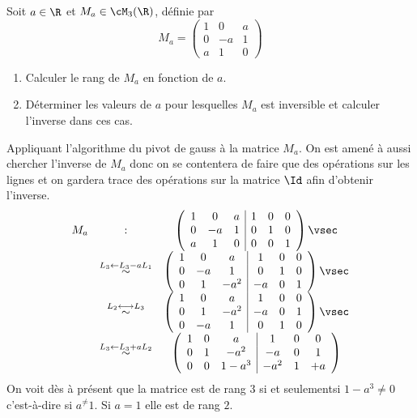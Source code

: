 \begin{exercice}
Soit $a\in \R$ et  $M_a \in\cM_3(\R) $, définie par 
$$ M_a =\left( 
\begin{array}{ccc}
1 & 0 & a\\
0 & -a & 1\\
a & 1 & 0
\end{array}
\right)$$
\begin{enumerate}
\item  Calculer le rang de $M_a$ en fonction de $a$. 
\item Déterminer les valeurs de $a$ pour lesquelles $M_a$ est inversible et calculer l'inverse dans ces cas. 
\end{enumerate}


\end{exercice}
\begin{correction}
Appliquant l'algorithme du pivot de gauss à la matrice $M_a$. On est amené à aussi chercher l'inverse de $M_a$ donc on se contentera de faire que des opérations sur les lignes et on gardera trace des opérations sur la matrice $\Id$ afin d'obtenir l'inverse. 
$$
\begin{array}{ccc}
 M_a & : &\left( 
\begin{array}{ccc|ccc}
1 & 0 & a &1 & 0 & 0\\
0 & -a & 1&  0& 1 & 0\\
a & 1 & 0&0 & 0 & 1
\end{array}
\right)\vsec \\
 &\stackrel{L_3\leftarrow L_3-aL_1}{\sim}&
\left( 
\begin{array}{ccc|ccc}
1 & 0 & a &1 & 0 & 0\\
0 & -a & 1&  0& 1 & 0\\
0 & 1 & -a^2&-a & 0 & 1
\end{array}
\right)\vsec \\
& \stackrel{L_2\longleftrightarrow L_3}{\sim}&
\left( 
\begin{array}{ccc|ccc}
1 & 0 & a &1 & 0 & 0\\
0 & 1 & -a^2&  -a& 0 & 1\\
0 & -a & 1&0 & 1 & 0
\end{array}
\right) \vsec \\
& \stackrel{L_3\leftarrow L_3+aL_2}{\sim}&
\left( 
\begin{array}{ccc|ccc}
1 & 0 & a &1 & 0 & 0\\
0 & 1 & -a^2&  -a& 0 & 1\\
0 & 0 & 1-a^3&-a^2 & 1 & +a
\end{array}
\right)\\
\end{array}
$$
On voit dès à présent que la matrice est de rang $3$ si et seulementsi $1-a^3\neq 0$ c'est-à-dire si $a^\neq 1$. Si $a=1$ elle est de rang  $2$. 


\end{correction}
